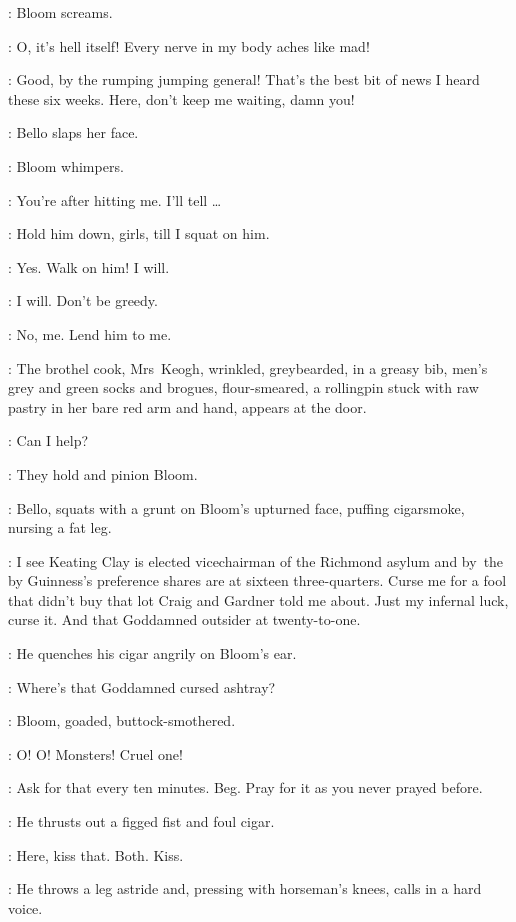 :
Bloom screams.

\Bloom:
O, it's hell itself!
Every nerve in my body aches like mad!

\Bello:
Good, by the rumping jumping general!
That's the best bit of news I heard these six weeks.
Here, don't keep me waiting, damn you!

:
Bello slaps her face.

:
Bloom whimpers.

\Bloom:
You're after hitting me.
I'll tell \ldots

\Bello:
Hold him down, girls, till I squat on him.

\Zoe:
Yes.
Walk on him!
I will.

\Florry:
I will.
Don't be greedy.

\Kitty:
No, me.
Lend him to me.

:
The brothel cook, Mrs~Keogh, wrinkled, greybearded, in a greasy bib,
men's grey and green socks and brogues, flour-smeared,
a rollingpin stuck with raw pastry in her bare red arm and hand,
appears at the door.

\MrsKeogh:
Can I help?

:
They hold and pinion Bloom.

:
Bello, squats with a grunt on Bloom's upturned face,
puffing cigarsmoke, nursing a fat leg.

\Bello:
I see Keating Clay is elected vicechairman of the Richmond asylum
and by~the by Guinness's preference shares are at sixteen three-quarters.
Curse me for a fool that didn't buy that lot Craig and Gardner told me about.
Just my infernal luck, curse it.
And that Goddamned outsider  at twenty-to-one.

:
He quenches his cigar angrily on Bloom's ear.

\Bello:
Where's that Goddamned cursed ashtray?

:
Bloom, goaded, buttock-smothered.

\Bloom:
O! O!
Monsters!
Cruel one!

\Bello:
Ask for that every ten minutes. Beg.
Pray for it as you never prayed before.

:
He thrusts out a figged fist and foul cigar.

\Bello:
Here, kiss that.
Both. Kiss.

:
He throws a leg astride and,
pressing with horseman's knees, calls in a hard voice.

